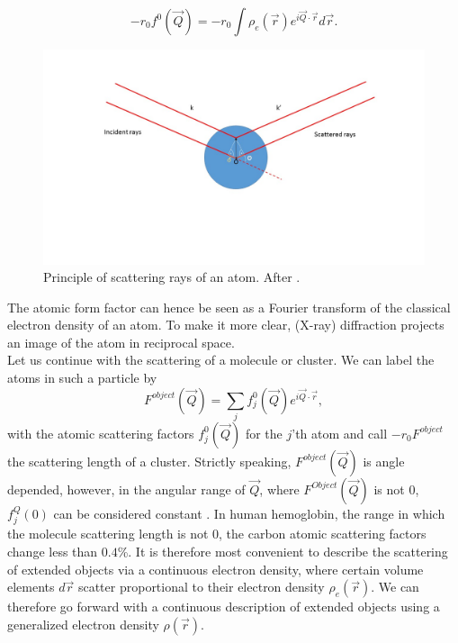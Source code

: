 \begin{equation}
-r_{0} f^{0}\left(\vec{Q}\right)=-r_{0}\int\rho_{e}\left(\vec{r}\right)e^{i \vec{Q}\cdot \vec{r}}d\vec{r}.
\label{eq:scattering-integral}
\end{equation}
\begin{figure}
	\centering
		\includegraphics[width=1.00\textwidth]{images/X-ray-scattering.jpg}
	\caption[Principle of scattering rays of an atom.]{Principle of scattering rays of an atom. After \cite{Als-Nielson-2011-JWS,Guinier-1955-JWS}.}
	\label{fig:X-ray-scattering}
\end{figure}
The atomic form factor can hence be seen as a Fourier transform of the classical electron density of an atom. To make it more clear, (X-ray) diffraction projects an image of the atom in reciprocal space.\\
Let us continue with the scattering of a molecule or cluster. We can label the atoms in such a particle by
\begin{equation}
F^{object}\left(\vec{Q}\right)=\sum_{j}f_{j}^{0}\left(\vec{Q}\right)e^{i \vec{Q}\cdot \vec{r}},
\label{eq:scattering-factor-object}
\end{equation}
with the atomic scattering factors $f_{j}^{0}\left(\vec{Q}\right)$ for the $j$'th atom and call $-r_{0} F^{object}$ the scattering length of a cluster. Strictly speaking, $F^{object}\left(\vec{Q}\right)$ is angle depended, however, in the angular range of $\vec{Q}$, where $F^{Object}\left(\vec{Q}\right)$ is not 0, $f_{j}^{Q}\left(0\right)$ can be considered constant \citep[see][p. 6-7]{Guinier-1955-JWS}. In human hemoglobin, the range in which the molecule scattering length is not 0, the carbon atomic scattering factors change less than $0.4$\%. It is therefore most convenient to describe the scattering of extended objects via a continuous electron density, where certain volume elements $d\vec{r}$ scatter proportional to their electron density $\rho_{e}\left(\vec{r}\right)$. We can therefore go forward with a continuous description of extended objects using a generalized electron density $\rho\left(\vec{r}\right)$.\\
